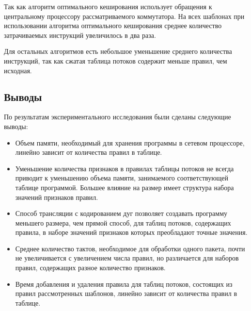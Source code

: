 \documentclass[oneside,final,12pt]{extarticle}
\begin{document}
        Так как алгоритм оптимального кеширования использует обращения к центральному процессору
        рассматриваемого коммутатора. На всех шаблонах при использовании алгоритма оптимального кеширования
        среднее количество затрачиваемых инструкций увеличилось в два раза.

        Для остальных алгоритмов есть небольшое уменьшение среднего количества инструкций,
        так как сжатая таблица потоков содержит меньше правил, чем исходная.
        \subsection{Выводы}
            По результатам экспериментального исследования были сделаны следующие выводы:
            \begin{itemize}
                \item Объем памяти, необходимый для хранения программы в сетевом процессоре, 
                    линейно зависит от количества правил в таблице.
                \item Уменьшение количества признаков в правилах таблицы потоков не всегда 
                    приводит к уменьшению объема памяти, занимаемого соответствующей таблице 
                    программой. Большее влияние на размер имеет структура набора значений 
                    признаков правил.
                \item Способ трансляции с кодированием дуг позволяет создавать программу меньшего
                    размера, чем прямой способ, для таблиц потоков, содержащих правила, 
                    в наборе значений признаков которых преобладают точные значения.
                \item Среднее количество тактов, необходимое для обработки одного пакета, почти 
                    не увеличивается с увеличением числа правил, но различается для 
                    наборов правил, содержащих разное количество признаков.
                \item Время добавления и удаления правила для таблиц потоков, состоящих из 
                    правил рассмотренных шаблонов, линейно зависит от количества правил в таблице.
            \end{itemize}
            \clearpage
\end{document}
